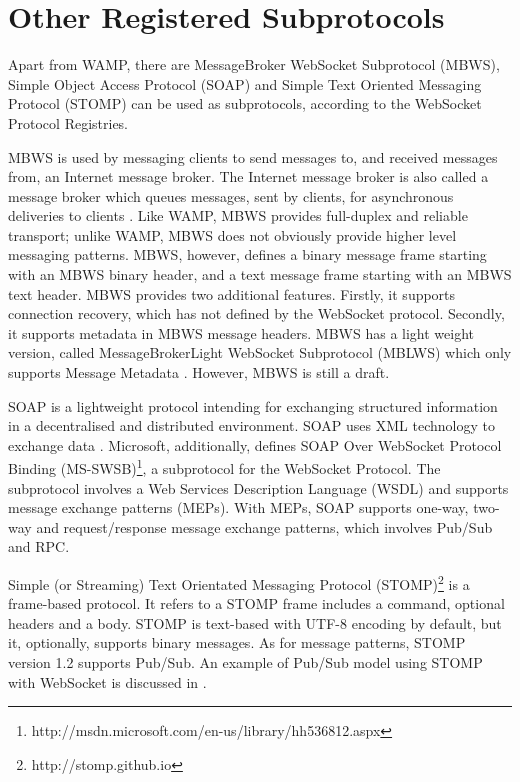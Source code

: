 \section{Other Registered Subprotocols}

Apart from WAMP, there are MessageBroker WebSocket Subprotocol (MBWS), Simple Object Access Protocol (SOAP) and Simple Text Oriented Messaging Protocol (STOMP) can be used as subprotocols, according to the WebSocket Protocol Registries.

MBWS is used by messaging clients to send messages to, and received messages from, an Internet message broker. The Internet message broker is also called a message broker which queues messages, sent by clients, for asynchronous deliveries to clients \cite{hapner2012messagebroker}. Like WAMP, MBWS provides full-duplex and reliable transport; unlike WAMP, MBWS does not obviously provide higher level messaging patterns. MBWS, however, defines a binary message frame starting with an MBWS binary header, and a text message frame starting with an MBWS text header. MBWS provides two additional features. Firstly, it supports connection recovery, which has not defined by the WebSocket protocol. Secondly, it supports metadata in MBWS message headers. MBWS has a light weight version, called MessageBrokerLight WebSocket Subprotocol (MBLWS) which only supports Message Metadata \cite{hapner2012messagebroker}. However, MBWS is still a draft. 

SOAP is a lightweight protocol intending for exchanging structured information in a decentralised and distributed environment. SOAP uses XML technology to exchange data \cite{gudginsoap}. Microsoft, additionally, defines SOAP Over WebSocket Protocol Binding (MS-SWSB)\footnote{http://msdn.microsoft.com/en-us/library/hh536812.aspx}, a subprotocol for the WebSocket Protocol. The subprotocol involves a Web Services Description Language (WSDL) and supports message exchange patterns (MEPs). With MEPs, SOAP supports one-way, two-way and request/response message exchange patterns, which involves Pub/Sub and RPC.

Simple (or Streaming) Text Orientated Messaging Protocol (STOMP)\footnote{http://stomp.github.io} is a frame-based protocol. It refers to a STOMP frame includes a command, optional headers and a body. STOMP is text-based with UTF-8 encoding by default, but it, optionally, supports binary messages. As for message patterns, STOMP version 1.2 supports Pub/Sub. An example of Pub/Sub model using STOMP with WebSocket is discussed in \cite{wang2012definitive}.

